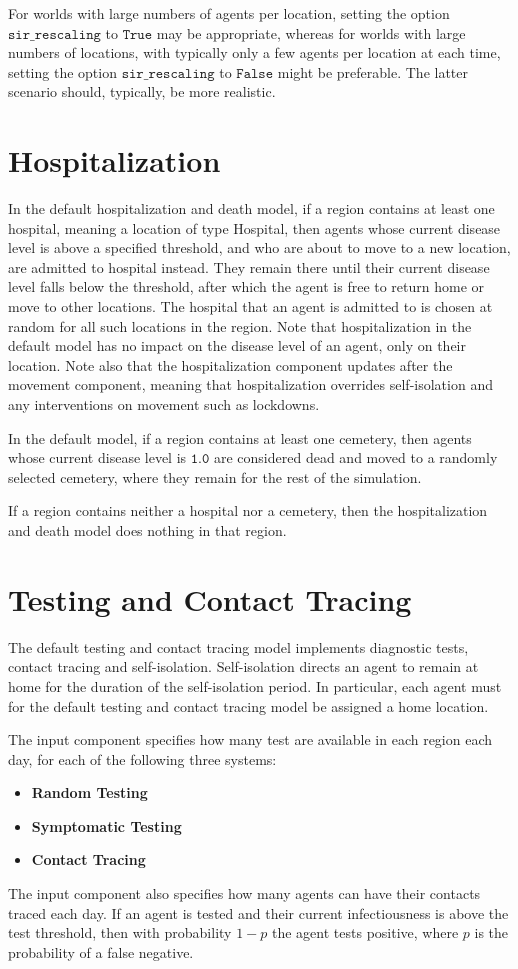 \documentclass[10pt,letterpaper]{article}
\begin{document}
For worlds with large numbers of agents per location, setting the option $\texttt{sir{\_}rescaling}$ to $\texttt{True}$ may be appropriate, whereas for worlds with large numbers of locations, with typically only a few agents per location at each time, setting the option $\texttt{sir{\_}rescaling}$ to $\texttt{False}$ might be preferable. The latter scenario should, typically, be more realistic.

\section{Hospitalization}

In the default hospitalization and death model, if a region contains at least one hospital, meaning a location of type Hospital, then agents whose current disease level is above a specified threshold, and who are about to move to a new location, are admitted to hospital instead. They remain there until their current disease level falls below the threshold, after which the agent is free to return home or move to other locations. The hospital that an agent is admitted to is chosen at random for all such locations in the region. Note that hospitalization in the default model has no impact on the disease level of an agent, only on their location. Note also that the hospitalization component updates after the movement component, meaning that hospitalization overrides self-isolation and any interventions on movement such as lockdowns.

In the default model, if a region contains at least one cemetery, then agents whose current disease level is $\texttt{1.0}$ are considered dead and moved to a randomly selected cemetery, where they remain for the rest of the simulation.

If a region contains neither a hospital nor a cemetery, then the hospitalization and death model does nothing in that region.

\section{Testing and Contact Tracing}

The default testing and contact tracing model implements diagnostic tests, contact tracing and self-isolation. Self-isolation directs an agent to remain at home for the duration of the self-isolation period. In particular, each agent must for the default testing and contact tracing model be assigned a home location.

The input component specifies how many test are available in each region each day, for each of the following three systems:
\begin{itemize}
\item \textbf{Random Testing}
\item \textbf{Symptomatic Testing}
\item \textbf{Contact Tracing}
\end{itemize}
The input component also specifies how many agents can have their contacts traced each day. If an agent is tested and their current infectiousness is above the test threshold, then with probability $ 1 - p $ the agent tests positive, where $p$ is the probability of a false negative.
\end{document}
